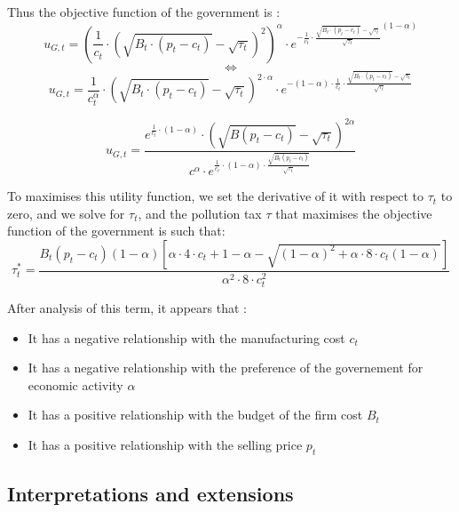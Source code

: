 \documentclass{article}
\begin{document}
Thus the objective function of the government is : 
$${u_{G,t}=\left(\frac{1}{c_{t}}\cdot\left({\sqrt{B_{t}\cdot (p_{t}-c_{t})}-\sqrt{\tau_{t}}}\right)^{2}\right)^{\alpha}\cdot {e^{-\frac{1}{c_{t}}\cdot \frac{\sqrt{B_{t}\cdot(p_{t}-c_{t})}-\sqrt{\tau_{t}}}{\sqrt{\tau_{t}}}}}^{(1-\alpha)}}$$
$$\iff$$
$${u_{G,t}=\frac{1}{c_{t}^\alpha}\cdot\left({\sqrt{B_{t}\cdot (p_{t}-c_{t})}-\sqrt{\tau_{t}}}\right)^{2\cdot\alpha}\cdot {e^{-(1-\alpha)\cdot\frac{1}{c_{t}}\cdot \frac{\sqrt{B_{t}\cdot(p_{t}-c_{t})}-\sqrt{\tau_{t}}}{\sqrt{\tau_{t}}}}}}$$

\begin{equation}
    u_{G,t}=\frac{e^{\frac{1}{c_{t}}\cdot\left(1-\alpha\right)}\cdot\left(\sqrt{B(p_{t}-c_{t})}-\sqrt{\tau_{t}}\right)^{2\alpha}}{c^{\alpha}\cdot e^{\frac{1}{c_{t}}\cdot(1-\alpha)\cdot\frac{\sqrt{B_{t}(p_{t}-c_{t})}}{\sqrt{\tau_{t}}}}}
\end{equation}

To maximises this utility function, we set the derivative of it with respect to $\tau_{t}$ to zero, and we solve for $\tau_{t}$, and the pollution tax $\tau$ that maximises the objective function of the government is such that\footnotemark[2] : 
\begin{equation}
    \tau_{t}^{*}=\frac{B_{t}\left(p_{t}-c_{t}\right)(1-\alpha)\left[{\alpha \cdot 4\cdot c_{t}+1-\alpha}-\sqrt{(1-\alpha)^{2}+\alpha\cdot8\cdot c_{t}(1-\alpha)}\right]} {\alpha^{2} \cdot 8\cdot c_{t}^{2}}
\end{equation}

After analysis of this term, it appears that : 
\begin{itemize}
    \item It has a negative relationship with the manufacturing cost $c_{t}$
    \item It has a negative relationship with the preference of the governement for economic activity $\alpha$
    \item It has a positive relationship with the budget of the firm cost $B_{t}$
    \item It has a positive relationship with the selling price $p_{t}$
\end{itemize}

\subsection{Interpretations and extensions}
\end{document}
